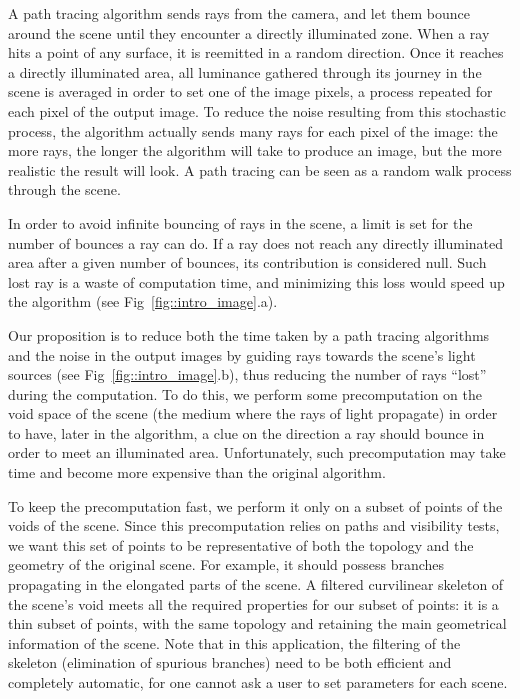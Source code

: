 \documentclass[final,envcountsame]{llncs}
\def\quotes#1{``#1''}
\begin{document}
A path tracing algorithm sends rays from the camera, and let them bounce around the scene until they encounter a directly illuminated zone. When a ray hits a point of any surface, it is reemitted in a random direction. Once it reaches a directly illuminated area, all luminance gathered through its journey in the scene is averaged in order to set one of the image pixels, a process repeated for each pixel of the output image. To reduce the noise resulting from this stochastic process, the algorithm actually sends many rays for each pixel of the image: the more rays, the longer the algorithm will take to produce an image, but the more realistic the result will look. A path tracing can be seen as a random walk process through the scene.

In order to avoid infinite bouncing of rays in the scene, a limit is set for the number of bounces a ray can do. If a ray does not reach any directly illuminated area after a given number of bounces, its contribution is considered null. Such lost ray is a waste of computation time, and minimizing this loss would speed up the algorithm (see Fig~\ref{fig::intro_image}.a).

Our proposition is to reduce both the time taken by a path tracing algorithms and the noise in the output images by guiding rays towards the scene's light sources (see Fig~\ref{fig::intro_image}.b), thus reducing the number of rays \quotes{lost} during the computation. To do this, we perform some precomputation on the void space of the scene (the medium where the rays of light propagate) in order to have, later in the algorithm, a clue on the direction a ray should bounce in order to meet an illuminated area. Unfortunately, such precomputation may take time and become more expensive than the original algorithm.

To keep the precomputation fast, we perform it only on a subset of points of the voids of the scene. Since this precomputation relies on paths and visibility tests, we want this set of points to be representative of both the topology and the geometry of the original scene. For example, it should possess branches propagating in the elongated parts of the scene. A filtered curvilinear skeleton of the scene's void meets all the required properties for our subset of points: it is a thin subset of points, with the same topology and retaining the main geometrical information of the scene. Note that in this application, the filtering of the skeleton (elimination of spurious branches) need to be both efficient and completely automatic, for one cannot ask a user to set parameters for each scene. 
\end{document}
